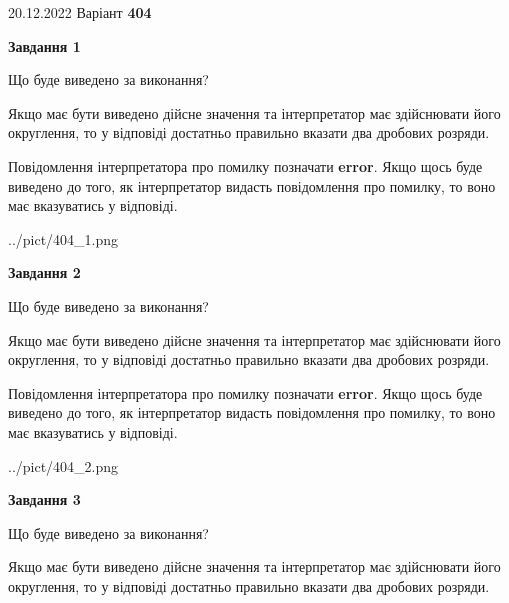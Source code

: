 \documentclass[12pt, ukrainian]{article}
\begin{document}
{20.12.2022 Варіант \No \textbf { 404 }\par}
{
\begin {Large}

{\begin {center}\textbf{Завдання 1}\end {center}}\par
Що буде виведено за виконання? \par

Якщо має бути виведено дійсне значення та інтерпретатор має здійснювати його округлення, 
то у відповіді достатньо правильно вказати два дробових розряди.

Повідомлення інтерпретатора про помилку позначати \textbf{error}.
Якщо щось буде виведено до того, як інтерпретатор видасть повідомлення про помилку, 
то воно має вказуватись у відповіді. \par

\begin{center}
	{../pict/404_1.png}
\end{center}
\newpage

{\begin {center}\textbf{Завдання 2}\end {center}}\par
Що буде виведено за виконання? \par

Якщо має бути виведено дійсне значення та інтерпретатор має здійснювати його округлення, 
то у відповіді достатньо правильно вказати два дробових розряди.

Повідомлення інтерпретатора про помилку позначати \textbf{error}.
Якщо щось буде виведено до того, як інтерпретатор видасть повідомлення про помилку, 
то воно має вказуватись у відповіді. \par

\begin{center}
	{../pict/404_2.png}
\end{center}
\newpage

{\begin {center}\textbf{Завдання 3}\end {center}}\par
Що буде виведено за виконання? \par

Якщо має бути виведено дійсне значення та інтерпретатор має здійснювати його округлення, 
то у відповіді достатньо правильно вказати два дробових розряди.


\end{Large}}
\end{document}
